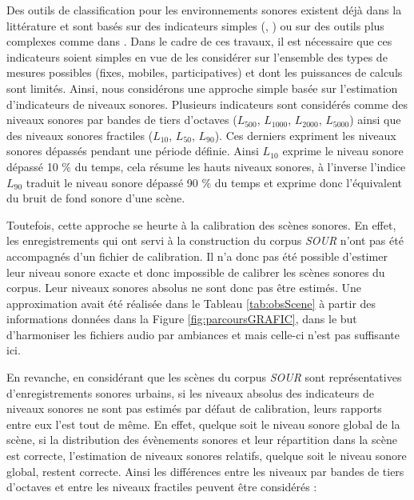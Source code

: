 Des outils de classification pour les environnements sonores existent déjà dans la littérature et sont basés sur des indicateurs simples (\cite{can_describing_2015}, \cite{rychtarikova2013soundscape}) ou sur des outils plus complexes comme dans \cite{salamon2015unsupervised}.
Dans le cadre de ces travaux, il est nécessaire que ces indicateurs soient simples en vue de les considérer sur l'ensemble des types de mesures possibles (fixes, mobiles, participatives) et dont les puissances de calculs sont limités. Ainsi, nous considérons une approche simple basée sur l'estimation d'indicateurs de niveaux sonores.
Plusieurs indicateurs sont considérés comme des niveaux sonores par bandes de tiers d'octaves ($L_{500}$, $L_{1000}$, $L_{2000}$, $L_{5000}$) ainsi que des niveaux sonores fractiles ($L_{10}$, $L_{50}$, $L_{90}$). Ces derniers expriment les niveaux sonores dépassés pendant une période définie. Ainsi $L_{10}$ exprime le niveau sonore dépassé 10 $\%$ du temps, cela résume les hauts niveaux sonores, à l'inverse l'indice $L_{90}$ traduit le niveau sonore dépassé 90 $\%$ du temps et exprime donc l'équivalent du bruit de fond sonore d'une scène.

Toutefois, cette approche se heurte à la calibration des scènes sonores. En effet, les enregistrements qui ont servi à la construction du corpus \textit{SOUR} n'ont pas été accompagnés d'un fichier de calibration. Il n'a donc pas été possible d'estimer leur niveau sonore exacte et donc impossible de calibrer les scènes sonores du corpus. Leur niveaux sonores absolus ne sont donc pas être estimés. Une approximation avait été réalisée dans le Tableau \ref{tab:obsScene} à partir des informations données dans la Figure \ref{fig:parcoursGRAFIC}, dans le but d'harmoniser les fichiers audio par ambiances et mais celle-ci n'est pas suffisante ici.

En revanche, en considérant que les scènes du corpus \textit{SOUR} sont représentatives d'enregistrements sonores urbains, si les niveaux absolus des indicateurs de niveaux sonores ne sont pas estimés par défaut de calibration, leurs rapports entre eux l'est tout de même. En effet, quelque soit le niveau sonore global de la scène, si la distribution des évènements sonores et leur répartition dans la scène est correcte, l'estimation de niveaux sonores relatifs, quelque soit le niveau sonore global, restent correcte.
Ainsi les différences entre les niveaux par bandes de tiers d'octaves et entre les niveaux fractiles peuvent être considérés : 

